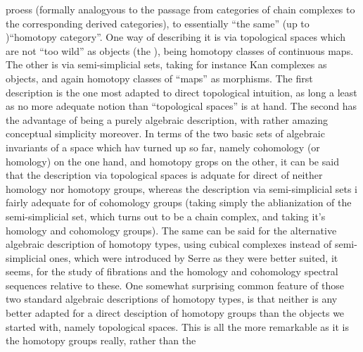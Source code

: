 proess (formally analogyous to the passage from  categories of
chain complexes to the corresponding derived categories), to essentially
``the same'' (up to )\hand{|}``homotopy category''. One way of describing
it is via topological spaces which are not ``too wild'' as objects (the
),  being homotopy classes of continuous maps. The
other is via semi-simplicial sets, taking for instance Kan complexes as
objects, and again homotopy classes of ``maps'' as morphisms. The first
description is the one most adapted to direct topological intuition,
as long a least as no more adequate notion than ``topological spaces'' is
at hand. The second has the advantage of being a purely algebraic
description, with rather amazing conceptual simplicity moreover. In
terms of the two basic sets of algebraic invariants of a space which hav
turned up so far, namely cohomology (or homology) on the one hand, and
homotopy grops on the other, it can be said that the description via
topological spaces is adquate for direct  of neither homology
nor homotopy groups, whereas the description via semi-simplicial sets i
fairly adequate for  of cohomology groups (taking simply the
ablianization of the semi-simplicial set, which turns out to be a
chain complex, and taking it's homology and cohomology groups). The
same can be said for the alternative algebraic description of homotopy
types, using cubical complexes instead of semi-simplicial ones, which
were introduced by Serre\hand{,} as they were better suited, it seems, for the
study of fibrations and  the homology and cohomology spectral sequences
relative to these. One somewhat surprising common feature of those two
standard algebraic descriptions of homotopy types, is that neither is
any better adapted for a direct desciption of homotopy groups than the
objects we started with, namely topological spaces. This is all the
more remarkable as it is the homotopy groups really, rather than the
